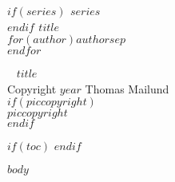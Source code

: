 \documentclass[11pt, openright, twoside, onecolumn, final]{memoir} %
\begin{document}
\frontmatter


\begingroup
\thispagestyle{empty}
{\bfseries\sffamily\noindent
$if(series)$ {\large $series$}\\[50pt]$endif$ %
{\huge $title$}\\[35pt] %
{\Large $for(author)$$author$$sep$\\$endfor$} %
}
\vfill
\endgroup



\newpage
~\vfill
\thispagestyle{empty}
{\Large $title$}\\[15pt] %
\noindent Copyright $year$ Thomas Mailund\\ %
$if(piccopyright)$\\[5pt]$piccopyright$\\ $endif$
\clearpage


$if(toc)$
\setcounter{tocdepth}{1}
\pagestyle{empty} %
\tableofcontents %
\cleardoublepage %
$endif$



\mainmatter
{}

\pagestyle{plain}                %
$body$

\end{document}
